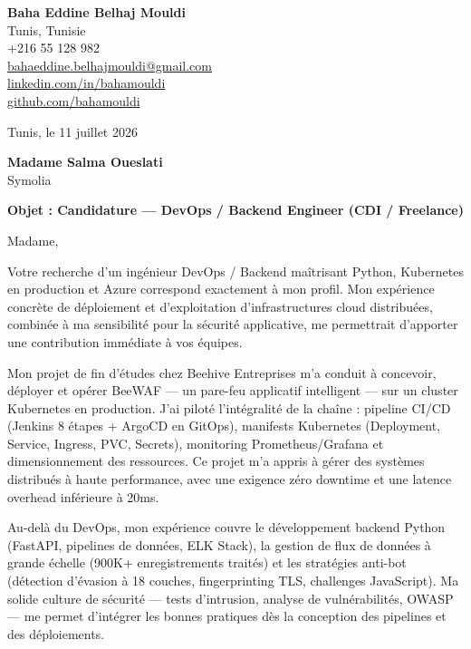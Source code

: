 \documentclass[a4paper,11pt]{article}
\begin{document}
\begin{flushright}
{\bfseries Baha Eddine Belhaj Mouldi}\\
Tunis, Tunisie\\
+216 55 128 982\\
\href{mailto:bahaeddine.belhajmouldi@gmail.com}{bahaeddine.belhajmouldi@gmail.com}\\
\href{https://linkedin.com/in/bahamouldi}{linkedin.com/in/bahamouldi}\\
\href{https://github.com/bahamouldi}{github.com/bahamouldi}
\end{flushright}

\vspace{0.8cm}

\begin{flushleft}
Tunis, le 11 juillet 2026

\vspace{0.8cm}

{\bfseries Madame Salma Oueslati}\\
Symolia

\vspace{0.6cm}

{\bfseries Objet : Candidature --- DevOps / Backend Engineer (CDI / Freelance)}
\end{flushleft}

\vspace{0.6cm}

Madame,

Votre recherche d'un ingénieur DevOps / Backend maîtrisant Python, Kubernetes en production et Azure correspond exactement à mon profil. Mon expérience concrète de déploiement et d'exploitation d'infrastructures cloud distribuées, combinée à ma sensibilité pour la sécurité applicative, me permettrait d'apporter une contribution immédiate à vos équipes.

Mon projet de fin d'études chez Beehive Entreprises m'a conduit à concevoir, déployer et opérer BeeWAF --- un pare-feu applicatif intelligent --- sur un cluster Kubernetes en production. J'ai piloté l'intégralité de la chaîne : pipeline CI/CD (Jenkins 8 étapes + ArgoCD en GitOps), manifests Kubernetes (Deployment, Service, Ingress, PVC, Secrets), monitoring Prometheus/Grafana et dimensionnement des ressources. Ce projet m'a appris à gérer des systèmes distribués à haute performance, avec une exigence zéro downtime et une latence overhead inférieure à 20ms.

Au-delà du DevOps, mon expérience couvre le développement backend Python (FastAPI, pipelines de données, ELK Stack), la gestion de flux de données à grande échelle (900K+ enregistrements traités) et les stratégies anti-bot (détection d'évasion à 18 couches, fingerprinting TLS, challenges JavaScript). Ma solide culture de sécurité --- tests d'intrusion, analyse de vulnérabilités, OWASP --- me permet d'intégrer les bonnes pratiques dès la conception des pipelines et des déploiements.
\end{document}
